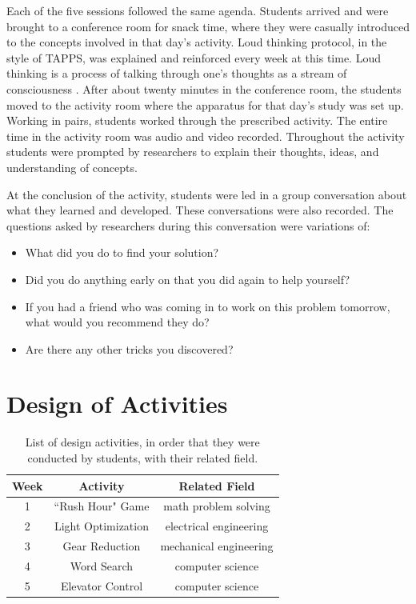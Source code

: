 Each of the five sessions followed the same agenda. Students arrived and were brought to a conference room for snack time, where they were casually introduced to the concepts involved in that day's activity. Loud thinking protocol, in the style of TAPPS, was explained and reinforced every week at this time. Loud thinking is a process of talking through one's thoughts as a stream of consciousness \citep{lochhead87}. After about twenty minutes in the conference room, the students moved to the activity room where the apparatus for that day's study was set up. Working in pairs, students worked through the prescribed activity. The entire time in the activity room was  audio and video recorded. Throughout the activity students were prompted by researchers to explain their thoughts, ideas, and understanding of concepts.

At the conclusion of the activity, students were led in a group conversation about what they learned and developed. These conversations were also recorded. The questions asked by researchers during this conversation were variations of:
\begin{itemize}
\item What did you do to find your solution?
\item Did you do anything early on that you did again to help yourself?
\item If you had a friend who was coming in to work on this problem tomorrow,
what would you recommend they do?
\item Are there any other tricks you discovered?
\end{itemize}

\section{Design of Activities}
\begin{table}
\begin{centering}
	\begin{tabular}{c  c   c}
	Week & Activity & Related Field \\ \hline
	1 & ``Rush Hour" Game & math problem solving \\ 
	2 & Light Optimization & electrical engineering \\ 
	3 & Gear Reduction & mechanical engineering \\ 
	4 & Word Search & computer science \\ 
	5 & Elevator Control & computer science \\ \hline
	\end{tabular}
	\caption[List of design activities.]{List of design activities, in order that they were conducted by students, with their related field.}
	\label{tab:activity-list}
\end{centering}
\end{table}

